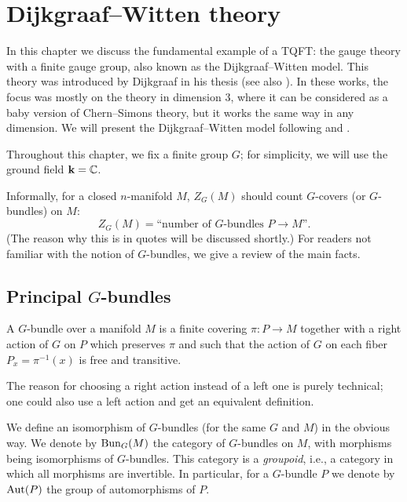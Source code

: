 \chapter{Dijkgraaf--Witten theory}\label{c:DW}
In this chapter we discuss the fundamental example of a TQFT:
the gauge theory with a finite gauge group, also known as the Dijkgraaf--Witten
model. This theory was introduced by Dijkgraaf in his thesis
\cite[Section 8.5]{dijkgraaf-thesis} (see also \cite[Section 6]{DW}). In
these works, the focus was mostly on the theory in dimension 3, where it can be
considered as a baby version of Chern--Simons theory, but it works the same way
in any dimension. We will present the Dijkgraaf--Witten model following
\cite{freed-quinn} and \cite{teleman-five-lectures}.

Throughout this chapter, we fix a finite group $G$; for simplicity, we will
use the ground field $\mathbf{k}=\mathbb{C}$.

Informally, for a closed $n$-manifold $M$, $Z_G(M)$ should count $G$-covers
(or $G$-bundles) on $M$:
\begin{equation}\label{e:dw-informal}
  Z_G(M)=\text{``number of $G$-bundles $P\to M$''}.
\end{equation}
(The reason why this is in quotes will be discussed shortly.) For readers
not familiar with the notion of $G$-bundles, we give a review of the main
facts.

\section{Principal $G$-bundles}\label{s:principal-bundles}

\begin{definition}\label{d:G-bundle}
  A $G$-bundle over a manifold $M$ is a finite covering $\pi\colon P\to M$
  together with a right action of $G$ on $P$ which preserves $\pi$ and
  such that the action of $G$ on each fiber $P_x=\pi^{-1}(x)$ is free and
  transitive.
\end{definition}
The reason for choosing a right action instead of a left one is purely
technical; one could also use a left action and get an equivalent definition.

We define an isomorphism of $G$-bundles (for the same $G$ and $M$) in the
obvious way. We denote by $\operatorname{Bun}_G(M)$ the category of $G$-bundles on $M$, with
morphisms being isomorphisms of $G$-bundles. This category is a
\emph{groupoid}, i.e., a category in which all morphisms are
invertible. In particular, for a $G$-bundle $P$ we denote by $\operatorname{Aut}(P)$ the group
of automorphisms of $P$.

